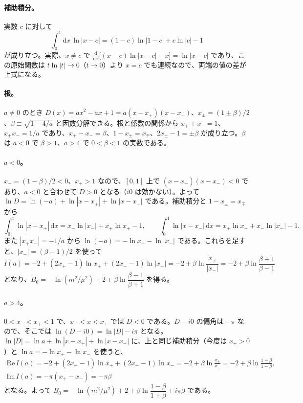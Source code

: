 \documentclass[a4paper,10pt]{ltjsarticle}
\newcommand{\dd}{\mathrm{d}}
\begin{document}
\paragraph{補助積分。}実数 $c$ に対して
\begin{equation*}
\int_0^1\dd x\,\ln|x-c|=(1-c)\ln|1-c|+c\ln|c|-1
\end{equation*}
が成り立つ。実際、$x\ne c$ で $\frac{\dd}{\dd x}\bigl[(x-c)\ln|x-c|-x\bigr]=\ln|x-c|$ であり、この原始関数は $t\ln|t|\to0$（$t\to0$）より $x=c$ でも連続なので、両端の値の差が上式になる。

\paragraph{根。}$a\ne0$ のとき $D(x)=ax^2-ax+1=a(x-x_+)(x-x_-)$、$x_\pm=(1\pm\beta)/2$、$\beta\equiv\sqrt{1-4/a}$ と因数分解できる。根と係数の関係から $x_++x_-=1$、$x_+x_-=1/a$ であり、$x_+-x_-=\beta$、$1-x_\pm=x_\mp$、$2x_\pm-1=\pm\beta$ が成り立つ。$\beta$ は $a<0$ で $\beta>1$、$a>4$ で $0<\beta<1$ の実数である。

\paragraph{$a<0$。}$x_-=(1-\beta)/2<0$、$x_+>1$ なので、$[0,1]$ 上で $(x-x_+)(x-x_-)<0$ であり、$a<0$ と合わせて $D>0$ となる（$i0$ は効かない）。よって $\ln D=\ln(-a)+\ln|x-x_+|+\ln|x-x_-|$ である。補助積分と $1-x_\pm=x_\mp$ から
\begin{equation*}
\int_0^1\ln|x-x_+|\,\dd x=x_-\ln|x_-|+x_+\ln x_+-1,\qquad
\int_0^1\ln|x-x_-|\,\dd x=x_+\ln x_++x_-\ln|x_-|-1 .
\end{equation*}
また $|x_+x_-|=-1/a$ から $\ln(-a)=-\ln x_+-\ln|x_-|$ である。これらを足すと、$|x_-|=(\beta-1)/2$ を使って
\begin{equation*}
I(a)=-2+(2x_+-1)\ln x_++(2x_--1)\ln|x_-|=-2+\beta\ln\frac{x_+}{|x_-|}=-2+\beta\ln\frac{\beta+1}{\beta-1}
\end{equation*}
となり、$B_0=-\ln(m^2/\mu^2)+2+\beta\ln\dfrac{\beta-1}{\beta+1}$ を得る。

\paragraph{$a>4$。}$0<x_-<x_+<1$ で、$x_-<x<x_+$ では $D<0$ である。$D-i0$ の偏角は $-\pi$ なので、そこでは $\ln(D-i0)=\ln|D|-i\pi$ となる。$\ln|D|=\ln a+\ln|x-x_+|+\ln|x-x_-|$ に、上と同じ補助積分（今度は $x_\pm>0$）と $\ln a=-\ln x_+-\ln x_-$ を使うと、
\begin{gather*}
\mathrm{Re}\,I(a)=-2+(2x_+-1)\ln x_++(2x_--1)\ln x_-=-2+\beta\ln\frac{x_+}{x_-}=-2+\beta\ln\frac{1+\beta}{1-\beta},\\
\mathrm{Im}\,I(a)=-\pi(x_+-x_-)=-\pi\beta
\end{gather*}
となる。よって $B_0=-\ln(m^2/\mu^2)+2+\beta\ln\dfrac{1-\beta}{1+\beta}+i\pi\beta$ である。
\end{document}
